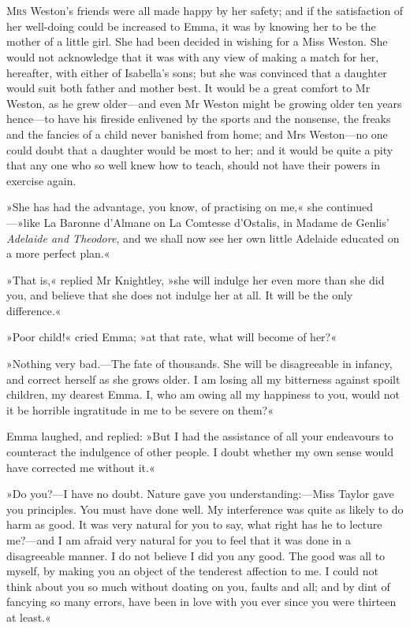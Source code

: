 \chapter[Chapter \thechapter]{}
\lettrine[lines=4,lraise=0.3]{M}{rs} Weston's friends were all made happy by her safety; and if the satisfaction of her well-doing could be increased to Emma, it was by knowing her to be the mother of a little girl. She had been decided in wishing for a Miss Weston. She would not acknowledge that it was with any view of making a match for her, hereafter, with either of Isabella's sons; but she was convinced that a daughter would suit both father and mother best. It would be a great comfort to Mr Weston, as he grew older—and even Mr Weston might be growing older ten years hence—to have his fireside enlivened by the sports and the nonsense, the freaks and the fancies of a child never banished from home; and Mrs Weston—no one could doubt that a daughter would be most to her; and it would be quite a pity that any one who so well knew how to teach, should not have their powers in exercise again.

»She has had the advantage, you know, of practising on me,« she continued—»like La Baronne d'Almane on La Comtesse d'Ostalis, in Madame de Genlis' \textit{Adelaide and Theodore}, and we shall now see her own little Adelaide educated on a more perfect plan.«

»That is,« replied Mr Knightley, »she will indulge her even more than she did you, and believe that she does not indulge her at all. It will be the only difference.«

»Poor child!« cried Emma; »at that rate, what will become of her?«

»Nothing very bad.—The fate of thousands. She will be disagreeable in infancy, and correct herself as she grows older. I am losing all my bitterness against spoilt children, my dearest Emma. I, who am owing all my happiness to you, would not it be horrible ingratitude in me to be severe on them?«

Emma laughed, and replied: »But I had the assistance of all your endeavours to counteract the indulgence of other people. I doubt whether my own sense would have corrected me without it.«

»Do you?—I have no doubt. Nature gave you understanding:—Miss Taylor gave you principles. You must have done well. My interference was quite as likely to do harm as good. It was very natural for you to say, what right has he to lecture me?—and I am afraid very natural for you to feel that it was done in a disagreeable manner. I do not believe I did you any good. The good was all to myself, by making you an object of the tenderest affection to me. I could not think about you so much without doating on you, faults and all; and by dint of fancying so many errors, have been in love with you ever since you were thirteen at least.«


